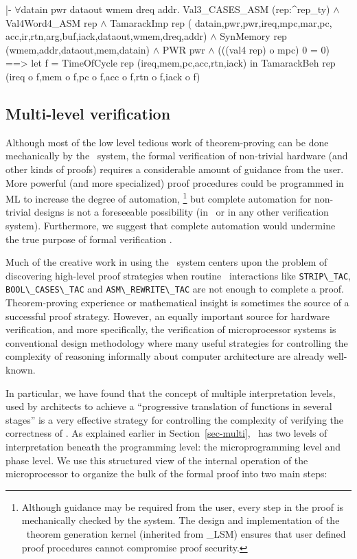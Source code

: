 \begintt
|- \(\forall\)datain pwr dataout wmem dreq addr.
     Val3_CASES_ASM (rep:^rep_ty) \(\wedge\)
     Val4Word4_ASM rep \(\wedge\)
     TamarackImp rep (
       datain,pwr,pwr,ireq,mpc,mar,pc,
       acc,ir,rtn,arg,buf,iack,dataout,wmem,dreq,addr) \(\wedge\)
     SynMemory rep (wmem,addr,dataout,mem,datain) \(\wedge\)
     PWR pwr \(\wedge\)
     (((val4 rep) o mpc) 0 = 0)
     ==>
     let f = TimeOfCycle rep (ireq,mem,pc,acc,rtn,iack) in
     TamarackBeh rep (ireq o f,mem o f,pc o f,acc o f,rtn o f,iack o f)
\endtt

\subsection{Multi-level verification}

Although most of the low level tedious work of theorem-proving
can be done mechanically by the \HOL\ system,
the formal verification of non-trivial hardware
(and other kinds of proofs) requires a considerable
amount of guidance from the user.
More powerful (and more specialized) proof procedures could
be programmed in ML to increase the degree of automation,
\footnote{
Although guidance may be required from the user,
every step in the proof is mechanically checked by the system.
The design and implementation
of the \HOL\ theorem generation kernel (inherited from \LCF\_LSM)
ensures that user defined proof procedures cannot compromise
proof security.}
but complete automation for non-trivial designs is
not a foreseeable possibility (in \HOL\ or in any other verification
system).
Furthermore, we suggest that complete automation
would undermine the true purpose of formal verification
\cite{Joyce:integration,Joyce:thesis}.

Much of the creative work in using the \HOL\ system
centers upon the problem of discovering high-level proof strategies
when routine \HOL\ interactions
like \mbox{\verb"STRIP\_TAC"},
\mbox{\verb"BOOL\_CASES\_TAC"} and
\mbox{\verb"ASM\_REWRITE\_TAC"} are not enough
to complete a proof.
Theorem-proving experience or mathematical insight is sometimes
the source of a successful proof strategy.
However, an equally important source for hardware verification,
and more specifically, the verification of microprocessor systems is
conventional design methodology
where many useful strategies for controlling the complexity of
reasoning informally about computer architecture
are already well-known.

In particular, we have found
that the concept of multiple interpretation levels,
used by architects to achieve a
``progressive translation of functions in several stages'' \cite{Anceau}
is a very effective strategy for controlling the complexity
of verifying the correctness of \Tamarack.
As explained earlier in Section~\ref{sec-multi},
\Tamarack\ has two levels of interpretation
beneath the programming
level: the microprogramming level and phase level.
We use this structured view of the internal operation of the
microprocessor to organize the bulk of the
formal proof into two main steps:

